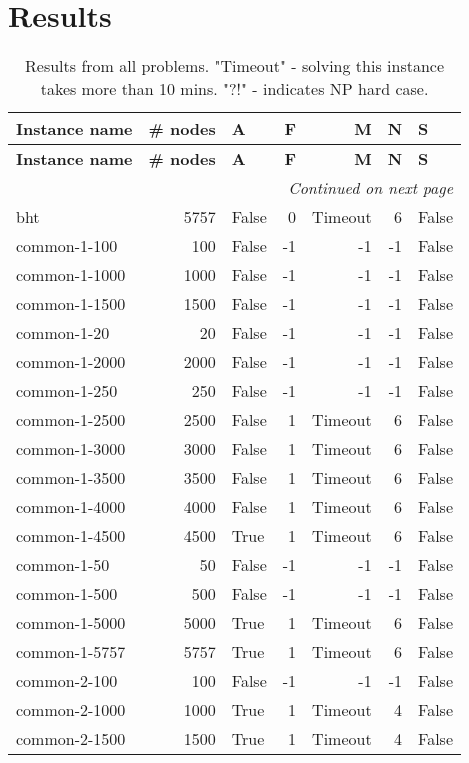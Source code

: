 \section{Results}
\begin{longtable}{lrlrrrl} \caption{Results from all problems. \n "Timeout" - solving this instance takes more than 10 mins. "?!" - indicates NP hard case.}\label{table:results} \toprule  \textbf{Instance name}& \textbf{\# nodes}& \textbf{A}& \textbf{F}& \textbf{M}& \textbf{N}& \textbf{S}\\
\midrule
\endfirsthead
\toprule
 \textbf{Instance name}& \textbf{\# nodes}& \textbf{A}& \textbf{F}& \textbf{M}& \textbf{N}& \textbf{S}\\
\midrule
\endhead
\midrule
\multicolumn{7}{r}{\textit{Continued on next page}} \\
\midrule
\endfoot
\bottomrule
\endlastfoot
bht & 5757 & False & 0 & Timeout & 6 & False \\
common-1-100 & 100 & False & -1 & -1 & -1 & False \\
common-1-1000 & 1000 & False & -1 & -1 & -1 & False \\
common-1-1500 & 1500 & False & -1 & -1 & -1 & False \\
common-1-20 & 20 & False & -1 & -1 & -1 & False \\
common-1-2000 & 2000 & False & -1 & -1 & -1 & False \\
common-1-250 & 250 & False & -1 & -1 & -1 & False \\
common-1-2500 & 2500 & False & 1 & Timeout & 6 & False \\
common-1-3000 & 3000 & False & 1 & Timeout & 6 & False \\
common-1-3500 & 3500 & False & 1 & Timeout & 6 & False \\
common-1-4000 & 4000 & False & 1 & Timeout & 6 & False \\
common-1-4500 & 4500 & True & 1 & Timeout & 6 & False \\
common-1-50 & 50 & False & -1 & -1 & -1 & False \\
common-1-500 & 500 & False & -1 & -1 & -1 & False \\
common-1-5000 & 5000 & True & 1 & Timeout & 6 & False \\
common-1-5757 & 5757 & True & 1 & Timeout & 6 & False \\
common-2-100 & 100 & False & -1 & -1 & -1 & False \\
common-2-1000 & 1000 & True & 1 & Timeout & 4 & False \\
common-2-1500 & 1500 & True & 1 & Timeout & 4 & False \\

\end{longtable}
